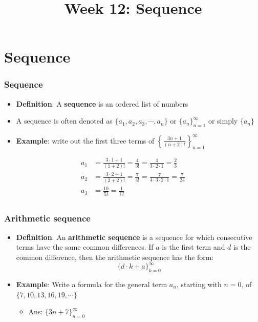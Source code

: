 \documentclass[t]{beamer}
\title{Week 12: Sequence}
\theoremstyle{plain}
\theoremstyle{definition}
\begin{document}
\frame{\titlepage}

\setcounter{tocdepth}{2}
\frame{\tableofcontents

}


\section{Sequence}

\begin{frame}
\frametitle{Sequence}

\begin{itemize}
	\item \textbf{Definition}: A \textbf{sequence} is an ordered list of numbers
	\item A sequence is often denoted as $\{a_1, a_2, a_3, \cdots, a_n\}$ or $\{a_n\}_{n=1}^{\infty}$ or simply $\{a_n\}$
	\item \textbf{Example}: write out the first three terms of $\left\{\frac{3n + 1}{(n+2)!}\right\}_{n=1}^{\infty}$
\end{itemize}

\begin{align*}
a_1 &= \frac{3 \cdot 1 + 1}{(1+2)!} = \frac{4}{3!} = \frac{4}{3\cdot 2 \cdot 1} = \frac{2}{3}\\
a_2 &= \frac{3 \cdot 2 + 1}{(2+2)!} = \frac{7}{4!} = \frac{7}{4 \cdot 3\cdot 2 \cdot 1} = \frac{7}{24}\\
a_3 &= \frac{10}{5!} = \frac{1}{12}\\
\end{align*}

\end{frame}

\begin{frame}
\frametitle{Arithmetic sequence}

\begin{itemize}
	\item \textbf{Definition}: An \textbf{arithmetic sequence} is a sequence for which consecutive terms have the same common differences.   If $a$ is the first term and $d$ is the common difference,  then the arithmetic sequence has the form:
	$$\{d \cdot k + a\}_{k=0}^{\infty}$$
	\item \textbf{Example}: Write a formula for the general term $a_n$, starting with $n = 0$, of $\{7, 10, 13, 16, 19, \cdots\}$
	\begin{itemize}
		\item Ans: $\{3n + 7\}_{n=0}^{\infty}$	
	\end{itemize}		
\end{itemize}

\end{frame}
\end{document}
